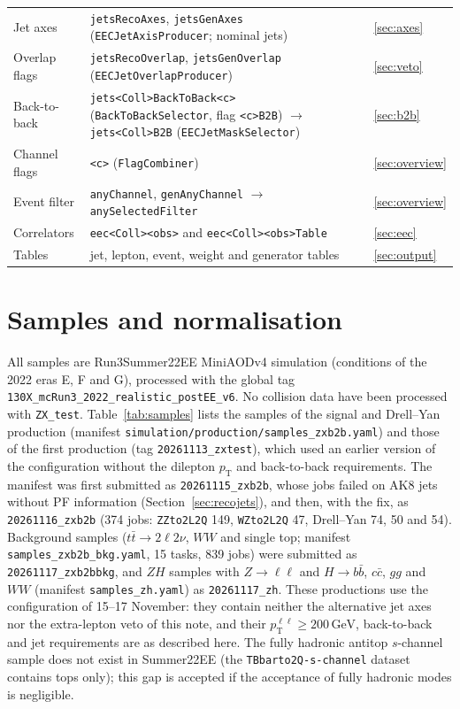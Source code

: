\documentclass[11pt]{article}
\newcommand{\pt}{p_{\mathrm{T}}}
\newcommand{\GeV}{\ensuremath{\,\mathrm{GeV}}}
\newcommand{\ptll}{\pt^{\ell\ell}}
\newcommand{\code}[1]{\texttt{#1}}
\begin{document}
\begin{table}[htbp]
\begin{tabularx}{\textwidth}{l>{\raggedright\arraybackslash}X>{\raggedright\arraybackslash}X}
Jet axes & \code{jetsRecoAxes}, \code{jetsGenAxes} (\code{EECJetAxisProducer}; nominal jets) & \ref{sec:axes} \\
Overlap flags & \code{jetsRecoOverlap}, \code{jetsGenOverlap} (\code{EECJetOverlapProducer}) & \ref{sec:veto} \\
Back-to-back & \code{jets<Coll>BackToBack<c>} (\code{BackToBackSelector}, flag \code{<c>B2B}) $\to$ \code{jets<Coll>B2B}
  (\code{EECJetMaskSelector}) & \ref{sec:b2b} \\
Channel flags & \code{<c>} (\code{FlagCombiner}) & \ref{sec:overview} \\
Event filter & \code{anyChannel}, \code{genAnyChannel} $\to$ \code{anySelectedFilter} & \ref{sec:overview} \\
Correlators & \code{eec<Coll><obs>} and \code{eec<Coll><obs>Table} & \ref{sec:eec} \\
Tables & jet, lepton, event, weight and generator tables & \ref{sec:output} \\
\bottomrule
\end{tabularx}
\end{table}

\section{Samples and normalisation}
\label{sec:samples}

All samples are Run3Summer22EE MiniAODv4 simulation (conditions of the 2022 eras E, F and G), processed with the global
tag \code{130X\_mcRun3\_2022\_realistic\_postEE\_v6}. No collision data have been processed with \code{ZX\_test}.
Table~\ref{tab:samples} lists the samples of the signal and Drell--Yan production (manifest
\code{simulation/production/samples\_zxb2b.yaml}) and those of the first production (tag
\code{20261113\_zxtest}), which used an earlier version of the configuration without the dilepton $\pt$ and back-to-back
requirements. The manifest was first submitted as \code{20261115\_zxb2b}, whose jobs failed on AK8 jets without PF
information (Section~\ref{sec:recojets}), and then, with the fix, as \code{20261116\_zxb2b} (374 jobs: \code{ZZto2L2Q} 149,
\code{WZto2L2Q} 47, Drell--Yan 74, 50 and 54). Background samples ($t\bar t\to2\ell2\nu$, $WW$ and single top; manifest
\code{samples\_zxb2b\_bkg.yaml}, 15 tasks, 839 jobs) were submitted as \code{20261117\_zxb2bbkg}, and $ZH$ samples with
$Z\to\ell\ell$ and $H\to b\bar b$, $c\bar c$, $gg$ and $WW$ (manifest \code{samples\_zh.yaml}) as \code{20261117\_zh}.
These productions use the configuration of 15--17 November: they contain neither the alternative jet axes nor the
extra-lepton veto of this note, and their $\ptll \geq 200\GeV$, back-to-back and jet requirements are as described here.
The fully hadronic antitop $s$-channel sample does not exist in Summer22EE (the \code{TBbarto2Q-s-channel} dataset contains
tops only); this gap is accepted if the acceptance of fully hadronic modes is negligible.
\end{document}
